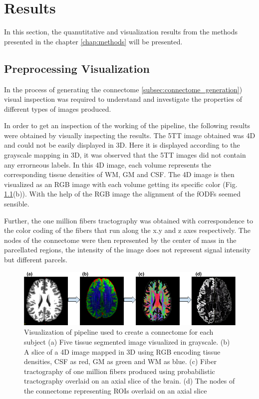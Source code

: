 \documentclass[msthesis.tex]{subfiles}
\begin{document}
\chapter{Results}
In this section, the quanutitative and visualization results from the methods presented in the chapter \ref{chap:methods} will be presented. 
\section{Preprocessing Visualization}

In the process of generating the connectome \autoref{subsec:connectome_generation}) visual inspection was required to understand and investigate the properties of different types of images produced. 

In order to get an inspection of the working of the pipeline, the following results were obtained by visually inspecting the results. The 5TT image obtained was 4D and could not be easily displayed in 3D. Here it is displayed according to the grayscale mapping in 3D, it was observed that the 5TT images did not contain any errorneous labels. In this 4D image, each volume represents the corresponding tissue densities of WM, GM and CSF. The 4D image is then visualized as an RGB image with each volume getting its specific color (Fig. \ref{fig:preproc}(b)). With the help of the RGB image the alignment of the fODFs seemed sensible. 

Further, the one million fibers tractography was obtained with correspondence to the color coding of the fibers that run along the x.y and z axes respectively. The nodes of the connectome were then represented by the center of mass in the parcellated regions, the intensity of the image does not represent signal intensity but different parcels. 
\begin{figure}
    \centering
    \includegraphics[width=\textwidth]{images/Preprocessing_pipeline.png}
    \caption{Visualization of pipeline used to create a connectome for each subject (a) Five tissue segmented image visualized in grayscale. (b) A slice of a 4D image mapped in 3D using RGB encoding tissue densities, CSF as red, GM as green and WM as blue. (c) Fiber tractography of one million fibers produced using probabilistic tractography overlaid on an axial slice of the brain. (d) The nodes of the connectome representing ROIs overlaid on an axial slice}
    \label{fig:preproc}
\end{figure}
\end{document}
